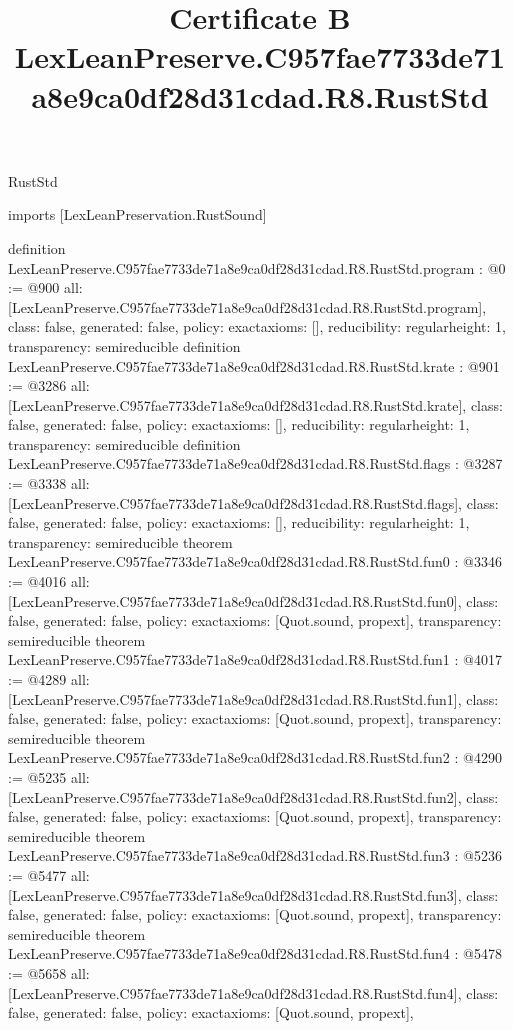 \begin{lexlean}{RustStd}
\title{Certificate B LexLeanPreserve.C957fae7733de71a8e9ca0df28d31cdad.R8.RustStd}
\begin{coremodule}
imports [LexLeanPreservation.RustSound]

definition LexLeanPreserve.C957fae7733de71a8e9ca0df28d31cdad.R8.RustStd.program : @0 := @900 {
  all: [LexLeanPreserve.C957fae7733de71a8e9ca0df28d31cdad.R8.RustStd.program],
  class: false,
  generated: false,
  policy: exact{axioms: []},
  reducibility: regular{height: 1},
  transparency: semireducible
}
definition LexLeanPreserve.C957fae7733de71a8e9ca0df28d31cdad.R8.RustStd.krate : @901 := @3286 {
  all: [LexLeanPreserve.C957fae7733de71a8e9ca0df28d31cdad.R8.RustStd.krate],
  class: false,
  generated: false,
  policy: exact{axioms: []},
  reducibility: regular{height: 1},
  transparency: semireducible
}
definition LexLeanPreserve.C957fae7733de71a8e9ca0df28d31cdad.R8.RustStd.flags : @3287 := @3338 {
  all: [LexLeanPreserve.C957fae7733de71a8e9ca0df28d31cdad.R8.RustStd.flags],
  class: false,
  generated: false,
  policy: exact{axioms: []},
  reducibility: regular{height: 1},
  transparency: semireducible
}
theorem LexLeanPreserve.C957fae7733de71a8e9ca0df28d31cdad.R8.RustStd.fun0 : @3346 := @4016 {
  all: [LexLeanPreserve.C957fae7733de71a8e9ca0df28d31cdad.R8.RustStd.fun0],
  class: false,
  generated: false,
  policy: exact{axioms: [Quot.sound, propext]},
  transparency: semireducible
}
theorem LexLeanPreserve.C957fae7733de71a8e9ca0df28d31cdad.R8.RustStd.fun1 : @4017 := @4289 {
  all: [LexLeanPreserve.C957fae7733de71a8e9ca0df28d31cdad.R8.RustStd.fun1],
  class: false,
  generated: false,
  policy: exact{axioms: [Quot.sound, propext]},
  transparency: semireducible
}
theorem LexLeanPreserve.C957fae7733de71a8e9ca0df28d31cdad.R8.RustStd.fun2 : @4290 := @5235 {
  all: [LexLeanPreserve.C957fae7733de71a8e9ca0df28d31cdad.R8.RustStd.fun2],
  class: false,
  generated: false,
  policy: exact{axioms: [Quot.sound, propext]},
  transparency: semireducible
}
theorem LexLeanPreserve.C957fae7733de71a8e9ca0df28d31cdad.R8.RustStd.fun3 : @5236 := @5477 {
  all: [LexLeanPreserve.C957fae7733de71a8e9ca0df28d31cdad.R8.RustStd.fun3],
  class: false,
  generated: false,
  policy: exact{axioms: [Quot.sound, propext]},
  transparency: semireducible
}
theorem LexLeanPreserve.C957fae7733de71a8e9ca0df28d31cdad.R8.RustStd.fun4 : @5478 := @5658 {
  all: [LexLeanPreserve.C957fae7733de71a8e9ca0df28d31cdad.R8.RustStd.fun4],
  class: false,
  generated: false,
  policy: exact{axioms: [Quot.sound, propext]},
}
\end{coremodule}
\end{lexlean}
